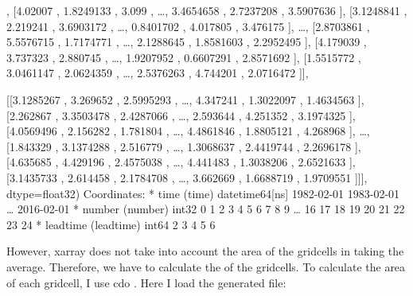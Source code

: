 \documentclass[letterpaper,10pt,english]{sphinxmanual}
\begin{document}
{\begin{sphinxVerbatim}[commandchars=\\\{\}]
       [[2.9105136 , 3.6938024 , 1.1343408 , {\ldots}, 1.1984391 ,
         2.9722617 , 2.1267796 ],
        [4.02007   , 1.8249133 , 3.099     , {\ldots}, 3.4654658 ,
         2.7237208 , 3.5907636 ],
        [3.1248841 , 2.219241  , 3.6903172 , {\ldots}, 0.8401702 ,
         4.017805  , 3.476175  ],
        {\ldots},
        [2.8703861 , 5.5576715 , 1.7174771 , {\ldots}, 2.1288645 ,
         1.8581603 , 2.2952495 ],
        [4.179039  , 3.737323  , 2.880745  , {\ldots}, 1.9207952 ,
         0.6607291 , 2.8571692 ],
        [1.5515772 , 3.0461147 , 2.0624359 , {\ldots}, 2.5376263 ,
         4.744201  , 2.0716472 ]],

       [[3.1285267 , 3.269652  , 2.5995293 , {\ldots}, 4.347241  ,
         1.3022097 , 1.4634563 ],
        [2.262867  , 3.3503478 , 2.4287066 , {\ldots}, 2.593644  ,
         4.251352  , 3.1974325 ],
        [4.0569496 , 2.156282  , 1.781804  , {\ldots}, 4.4861846 ,
         1.8805121 , 4.268968  ],
        {\ldots},
        [1.843329  , 3.1374288 , 2.516779  , {\ldots}, 1.3068637 ,
         2.4419744 , 2.2696178 ],
        [4.635685  , 4.429196  , 2.4575038 , {\ldots}, 4.441483  ,
         1.3038206 , 2.6521633 ],
        [3.1435733 , 2.614458  , 2.1784708 , {\ldots}, 3.662669  ,
         1.6688719 , 1.9709551 ]]], dtype=float32)
Coordinates:
  * time      (time) datetime64[ns] 1982-02-01 1983-02-01 {\ldots} 2016-02-01
  * number    (number) int32 0 1 2 3 4 5 6 7 8 9 {\ldots} 16 17 18 19 20 21 22 23 24
  * leadtime  (leadtime) int64 2 3 4 5 6
\end{sphinxVerbatim}
}

However, xarray does not take into account the area of the gridcells in taking the average. Therefore, we have to calculate the  of the gridcells. To calculate the area of each gridcell, I use cdo . Here I load the generated file:

{
\begin{sphinxVerbatim}[commandchars=\\\{\}]
\llap{\color{nbsphinxin}[12]:\,\hspace{\fboxrule}\hspace{\fboxsep}}  
\PYG{p}{[}\PYG{p}{]}
\end{sphinxVerbatim}
}
\end{document}
